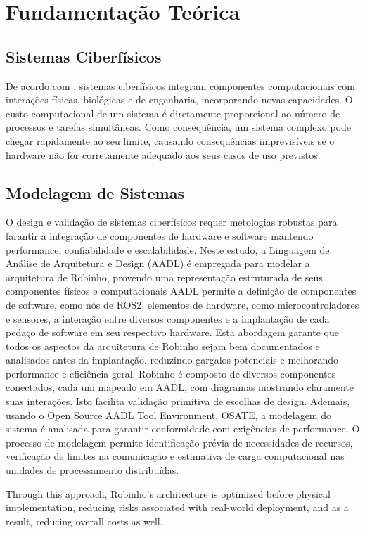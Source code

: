 \chapter{Fundamentação Teórica}
\section{Sistemas Ciberfísicos}
De acordo com \cite{Moraes2013}, sistemas ciberfísicos integram componentes computacionais com interações físicas, biológicas e de engenharia, incorporando novas capacidades. O custo computacional de um sistema é diretamente proporcional ao número de processos e tarefas simultâneas. Como consequência, um sistema complexo pode chegar rapidamente ao seu limite, causando consequências imprevisíveis se o hardware não for corretamente adequado aos seus casos de uso previstos. \cite{SennBourdon2022}
 
\section{Modelagem de Sistemas}

O design e validação de sistemas ciberfísicos requer metologias robustas para farantir a integração de componentes de hardware e software mantendo performance, confiabilidade e escalabilidade. Neste estudo, a Linguagem de Análise de Arquitetura e Design (AADL) é empregada para modelar a arquitetura de Robinho, provendo uma representação estruturada de seus componentes físicos e computacionais
AADL permite a definição de componentes de software, como nós de ROS2, elementos de hardware, como microcontroladores e sensores, a interação entre diversos componentes e a implantação de cada pedaço de software em seu respectivo hardware. Esta abordagem garante que todos os aspectos da arquitetura de Robinho sejam bem documentados e analisados antes da implantação, reduzindo gargalos potenciais e melhorando performance e eficiência geral.
Robinho é composto de diversos componentes conectados, cada um mapeado em AADL, com diagramas mostrando claramente suas interações. Isto facilita validação primitiva de escolhas de design. 
Ademais, usando o Open Source AADL Tool Environment, OSATE, a modelagem do sistema é analisada para garantir conformidade com exigências de performance. O processo de modelagem permite identificação prévia de necessidades de recursos, verificação de limites na comunicação e estimativa de carga computacional nas unidades de processamento distribuídas.

Through this approach, Robinho's architecture is optimized before physical implementation, reducing risks associated with real-world deployment, and as a result, reducing overall costs as well.

